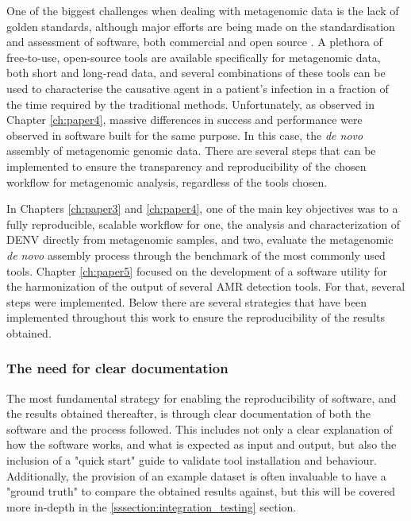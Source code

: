 One of the biggest challenges when dealing with metagenomic data is the lack of golden standards, although major efforts are being made on the standardisation and assessment of software, both commercial and open source \citep{angers-loustau_challenges_2018, gruening_recommendations_2019, sczyrba_critical_2017, couto_critical_2018}. A plethora of free-to-use, open-source tools are available specifically for metagenomic data, both short and long-read data, and several combinations of these tools can be used to characterise the causative agent in a patient's infection in a fraction of the time required by the traditional methods. Unfortunately, as observed in Chapter \ref{ch:paper4}, massive differences in success and performance were observed in software built for the same purpose. In this case, the \textit{de novo} assembly of metagenomic genomic data. There are several steps that can be implemented to ensure the transparency and reproducibility of the chosen workflow for metagenomic analysis, regardless of the tools chosen. 

In Chapters \ref{ch:paper3} and \ref{ch:paper4}, one of the main key objectives was to a fully reproducible, scalable workflow for one, the analysis and characterization of \ac{DENV} directly from metagenomic samples, and two, evaluate the metagenomic \textit{de novo} assembly process through the benchmark of the most commonly used tools. Chapter \ref{ch:paper5} focused on the development of a software utility for the harmonization of the output of several \ac{AMR} detection tools. For that, several steps were implemented. Below there are several strategies that have been implemented throughout this work to ensure the reproducibility of the results obtained. 

\subsubsection{The need for clear documentation}

The most fundamental strategy for enabling the reproducibility of software, and the results obtained thereafter, is through clear documentation of both the software and the process followed. This includes not only a clear explanation of how the software works, and what is expected as input and output, but also the inclusion of a "quick start" guide to validate tool installation and behaviour. Additionally, the provision of an example dataset is often invaluable to have a "ground truth" to compare the obtained results against, but this will be covered more in-depth in the \ref{sssection:integration_testing} section. 

